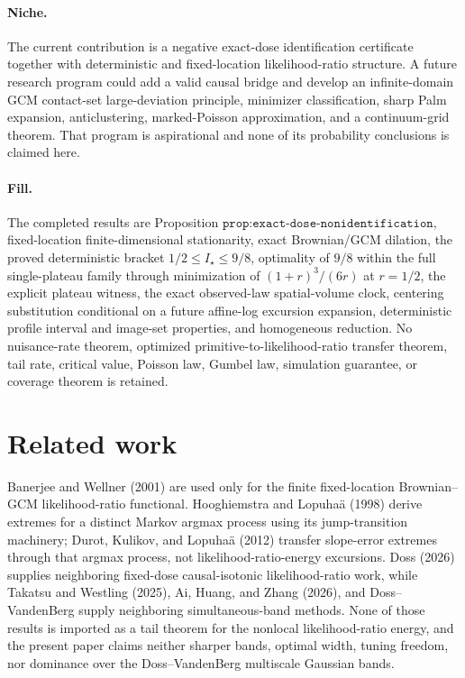 \documentclass{article}
\begin{document}
\paragraph{Niche.} The current contribution is a negative exact-dose identification certificate together with deterministic and fixed-location likelihood-ratio structure. A future research program could add a valid causal bridge and develop an infinite-domain GCM contact-set large-deviation principle, minimizer classification, sharp Palm expansion, anticlustering, marked-Poisson approximation, and a continuum-grid theorem. That program is aspirational and none of its probability conclusions is claimed here.

\paragraph{Fill.} The completed results are Proposition \(\texttt{prop:exact-dose-nonidentification}\), fixed-location finite-dimensional stationarity, exact Brownian/GCM dilation, the proved deterministic bracket \(1/2\le I_\star\le9/8\), optimality of \(9/8\) within the full single-plateau family through minimization of \((1+r)^3/(6r)\) at \(r=1/2\), the explicit plateau witness, the exact observed-law spatial-volume clock, centering substitution conditional on a future affine-log excursion expansion, deterministic profile interval and image-set properties, and homogeneous reduction. No nuisance-rate theorem, optimized primitive-to-likelihood-ratio transfer theorem, tail rate, critical value, Poisson law, Gumbel law, simulation guarantee, or coverage theorem is retained.

\section{Related work}

Banerjee and Wellner (2001) are used only for the finite fixed-location Brownian--GCM likelihood-ratio functional. Hooghiemstra and Lopuhaä (1998) derive extremes for a distinct Markov argmax process using its jump-transition machinery; Durot, Kulikov, and Lopuhaä (2012) transfer slope-error extremes through that argmax process, not likelihood-ratio-energy excursions. Doss (2026) supplies neighboring fixed-dose causal-isotonic likelihood-ratio work, while Takatsu and Westling (2025), Ai, Huang, and Zhang (2026), and Doss--VandenBerg supply neighboring simultaneous-band methods. None of those results is imported as a tail theorem for the nonlocal likelihood-ratio energy, and the present paper claims neither sharper bands, optimal width, tuning freedom, nor dominance over the Doss--VandenBerg multiscale Gaussian bands.
\end{document}
